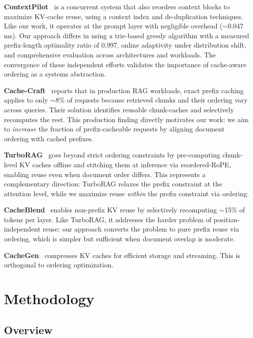 \documentclass{article}
\begin{document}
\textbf{ContextPilot}~\citep{contextpilot2025} is a concurrent system that also reorders context blocks to maximize KV-cache reuse, using a context index and de-duplication techniques. Like our work, it operates at the prompt layer with negligible overhead (${\sim}$0.047\,ms). Our approach differs in using a trie-based greedy algorithm with a measured prefix-length optimality ratio of 0.997, online adaptivity under distribution shift, and comprehensive evaluation across architectures and workloads. The convergence of these independent efforts validates the importance of cache-aware ordering as a systems abstraction.

\textbf{Cache-Craft}~\citep{cachecraft2025} reports that in production RAG workloads, exact prefix caching applies to only ${\sim}$8\% of requests because retrieved chunks and their ordering vary across queries. Their solution identifies reusable chunk-caches and selectively recomputes the rest. This production finding directly motivates our work: we aim to \emph{increase} the fraction of prefix-cacheable requests by aligning document ordering with cached prefixes.

\textbf{TurboRAG}~\citep{turborag2024} goes beyond strict ordering constraints by pre-computing chunk-level KV caches offline and stitching them at inference via reordered-RoPE, enabling reuse even when document order differs. This represents a complementary direction: TurboRAG relaxes the prefix constraint at the attention level, while we maximize reuse \emph{within} the prefix constraint via ordering.

\textbf{CacheBlend}~\citep{yao2025cacheblend} enables non-prefix KV reuse by selectively recomputing ${\sim}$15\% of tokens per layer. Like TurboRAG, it addresses the harder problem of position-independent reuse; our approach converts the problem to pure prefix reuse via ordering, which is simpler but sufficient when document overlap is moderate.

\textbf{CacheGen}~\citep{lmcache2024} compresses KV caches for efficient storage and streaming. This is orthogonal to ordering optimization.

\section{Methodology}
\label{sec:design}

\subsection{Overview}
\end{document}
